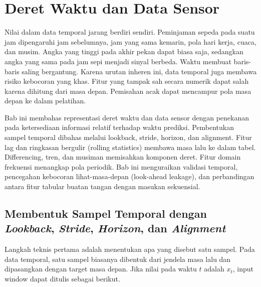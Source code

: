 \chapter{Deret Waktu dan Data Sensor}\label{deret-waktu-dan-data-sensor}

Nilai dalam data temporal jarang berdiri sendiri. Peminjaman sepeda pada suatu jam dipengaruhi jam sebelumnya, jam yang sama kemarin, pola hari kerja, cuaca, dan musim. Angka yang tinggi pada akhir pekan dapat biasa saja, sedangkan angka yang sama pada jam sepi menjadi sinyal berbeda. Waktu membuat baris-baris saling bergantung. Karena urutan inheren ini, data temporal juga membawa risiko kebocoran yang khas. Fitur yang tampak sah secara numerik dapat salah karena dihitung dari masa depan. Pemisahan acak dapat mencampur pola masa depan ke dalam pelatihan.

Bab ini membahas representasi deret waktu dan data sensor dengan penekanan pada ketersediaan informasi relatif terhadap waktu prediksi. Pembentukan sampel temporal dibahas melalui lookback, stride, horizon, dan alignment. Fitur lag dan ringkasan bergulir (rolling statistics) membawa masa lalu ke dalam tabel. Differencing, tren, dan musiman memisahkan komponen deret. Fitur domain frekuensi menangkap pola periodik. Bab ini menguraikan validasi temporal, pencegahan kebocoran lihat-masa-depan (look-ahead leakage), dan perbandingan antara fitur tabular buatan tangan dengan masukan sekuensial.

\section{\texorpdfstring{Membentuk Sampel Temporal dengan \emph{Lookback}, \emph{Stride}, \emph{Horizon}, dan \emph{Alignment}}{Membentuk Sampel Temporal dengan Lookback, Stride, Horizon, dan Alignment}}\label{membentuk-sampel-temporal-dengan-lookback-stride-horizon-dan-alignment}

Langkah teknis pertama adalah menentukan apa yang disebut satu sampel. Pada data temporal, satu sampel biasanya dibentuk dari jendela masa lalu dan dipasangkan dengan target masa depan. Jika nilai pada waktu \(t\) adalah \(x_t\), input window dapat ditulis sebagai berikut.


